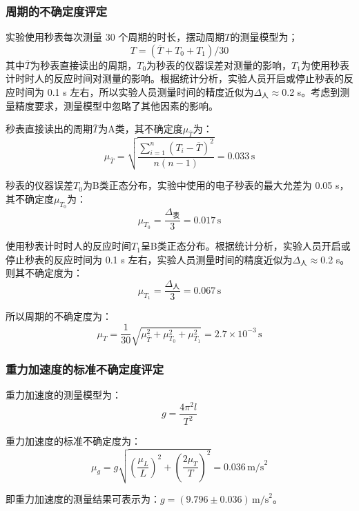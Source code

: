 \documentclass[a4paper]{extarticle}
\begin{document}
    \subsubsection{周期的不确定度评定}
    \hspace{2em}
    实验使用秒表每次测量 30 个周期的时长，摆动周期$T$的测量模型为；
    \begin{equation*}
        T=(\overline{T}+T_0+T_1)/30
    \end{equation*}
    其中$\overline{T}$为秒表直接读出的周期，$T_0$为秒表的仪器误差对测量的影响，$T_1$为使用秒表计时时人的反应时间对测量的影响。根据统计分析，实验人员开启或停止秒表的反应时间为 0.1 s 左右，所以实验人员测量时间的精度近似为$\Delta_\text{人}\approx$0.2 s。考虑到测量精度要求，测量模型中忽略了其他因素的影响。
    \par\hspace{2em}
    秒表直接读出的周期$\overline{T}$为A类，其不确定度$\mu_{\overline{T}}$为：
    \begin{equation*}
        \mu_{\overline{T}}=\sqrt{\frac{\sum\limits_{i=1}^{n}(T_i-\overline{T})^2}{n(n-1)}}=0.033\,\text{s}
    \end{equation*}
    \par\hspace{2em}
    秒表的仪器误差$T_0$为B类正态分布，实验中使用的电子秒表的最大允差为 0.05 s，其不确定度$\mu_{T_0}$为：
    \begin{equation*}
        \mu_{T_0}=\frac{\Delta_\text{表}}{3}=0.017\,\text{s}
    \end{equation*}
    \par\hspace{2em}
    使用秒表计时时人的反应时间$T_1$呈B类正态分布。根据统计分析，实验人员开启或停止秒表的反应时间为 0.1 s 左右，实验人员测量时间的精度近似为$\Delta_\text{人}\approx$0.2 s。则其不确定度为：
    \begin{equation*}
        \mu_{T_1}=\frac{\Delta_\text{人}}{3}=0.067\,\text{s}
    \end{equation*}
    \par\hspace{2em}
    所以周期的不确定度为：
    \begin{equation*}
        \mu_T=\frac{1}{30}\sqrt{\mu_{\overline{T}}^2+\mu_{T_0}^2+\mu_{T_1}^2}=2.7\times10^{-3}\,\text{s}
    \end{equation*}
    \subsubsection{重力加速度的标准不确定度评定}
    \hspace{2em}
    重力加速度的测量模型为：
    \begin{equation*}
        g=\frac{4\pi^2l}{T^2}
    \end{equation*}
    \par\hspace{2em}
    重力加速度的标准不确定度为：
    \begin{equation*}
        \mu_g=g\sqrt{\left(\frac{\mu_L}{L}\right)^2+\left(\frac{2\mu_T}{T}\right)^2}=0.036\,\text{m/s}^2
    \end{equation*}
    \par\hspace{2em}
    即重力加速度的测量结果可表示为：$g=(9.796\pm0.036)\,\text{m/s}^2$。
\end{document}
